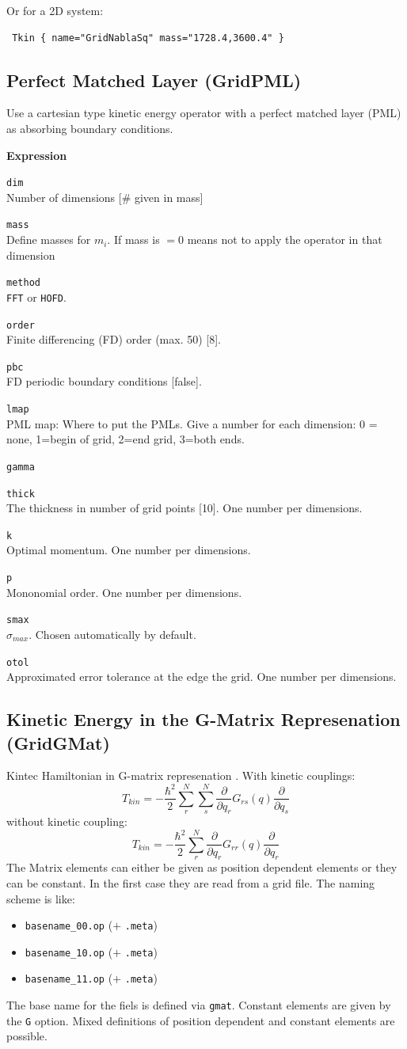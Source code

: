 \documentclass[a4paper,12pt]{scrbook}
\newcommand{\option}[2]{\item \texttt{#1}\\ #2}
\newcommand{\code}[1]{\texttt{#1}}
\begin{document}
Or for a 2D system:
\begin{verbatim}
 Tkin { name="GridNablaSq" mass="1728.4,3600.4" }
\end{verbatim}


\subsection{Perfect Matched Layer (GridPML)}
Use a cartesian type kinetic energy operator with a perfect matched layer (PML) \cite{Nissen10} as
absorbing boundary conditions.

\textbf{Expression}

\begin{options}
 \option{dim}{Number of dimensions [\# given in mass]}
 \option{mass}{Define masses for $m_i$. If mass is $= 0$ means not to apply the operator in that dimension}
 \option{method}{\code{FFT} or \code{HOFD}.}
 \option{order}{Finite differencing (FD) order (max. 50) [8].}
 \option{pbc}{FD periodic boundary conditions [false].}
 \option{lmap}{PML map: Where to put the PMLs. Give a number for each dimension: 0 = none, 1=begin of grid, 2=end grid, 3=both ends.}
 \option{gamma}{}
 \option{thick}{The thickness in number of grid points [10]. One number per dimensions.}
 \option{k}{Optimal momentum. One number per dimensions.}
 \option{p}{Mononomial order. One number per dimensions.}
 \option{smax}{$\sigma_{max}$. Chosen automatically by default.}
 \option{otol}{Approximated error tolerance at the edge the grid. One number per dimensions.}
\end{options}

\subsection{Kinetic Energy in the G-Matrix Represenation (GridGMat)}
Kintec Hamiltonian in G-matrix represenation \cite{Stare03}. With kinetic
couplings:
\begin{equation}
 T_{kin} = -\frac{\hbar^2}{2} \sum_r^N \sum_s^N \frac{\partial}{\partial q_r} G_{rs}(q) \frac{\partial}{\partial q_s}
\end{equation}
without kinetic coupling:
\begin{equation}
 T_{kin} = -\frac{\hbar^2}{2} \sum_r^N \frac{\partial}{\partial q_r} G_{rr}(q) \frac{\partial}{\partial q_r}
\end{equation}
The Matrix elements can either be given as position dependent elements or they can be constant.
In the first case they are read from a grid file. The naming scheme is like:
\begin{itemize}
 \item \verb|basename_00.op| ($+$ \verb|.meta|)
 \item \verb|basename_10.op| ($+$ \verb|.meta|)
 \item \verb|basename_11.op| ($+$ \verb|.meta|)
\end{itemize}
The base name for the fiels is defined via \verb|gmat|. Constant elements are given by the \verb|G| option.
Mixed definitions of position dependent and constant elements are possible.
\end{document}
